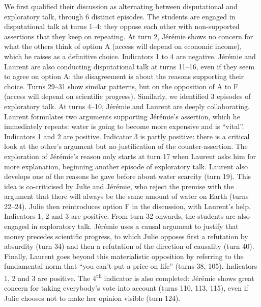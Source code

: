 \documentclass[output=paper]{langscibook}
\begin{document}
We first qualified their discussion as alternating between disputational and exploratory talk, through 6 distinct episodes. The students are engaged in disputational talk at turns 1--4: they oppose each other with non-supported assertions that they keep on repeating. At turn 2, Jérémie shows no concern for what the others think of option A (access will depend on economic income), which he raises as a definitive choice. Indicators 1 to 4 are negative. Jérémie and Laurent are also conducting disputational talk at turns 11--16, even if they seem to agree on option A: the disagreement is about the reasons supporting their choice. Turns 29--31 show similar patterns, but on the opposition of A to F (access will depend on scientific progress). Similarly, we identified 3 episodes of exploratory talk. At turns 4--10, Jérémie and Laurent are deeply collaborating. Laurent formulates two arguments supporting Jérémie’s assertion, which he immediately repeats: water is going to become more expensive and is “vital”. Indicators 1 and 2 are positive. Indicator 3 is partly positive: there is a critical look at the other’s argument but no justification of the counter-assertion. The exploration of Jérémie’s reason only starts at turn 17 when Laurent asks him for more explanation, beginning another episode of exploratory talk. Laurent also develops one of the reasons he gave before about water scarcity (turn 19). This idea is co-criticised by Julie and Jérémie, who reject the premise with the argument that there will always be the same amount of water on Earth (turns 22--24). Julie then reintroduces option F in the discussion, with Laurent’s help. Indicators 1, 2 and 3 are positive. From turn 32 onwards, the students are also engaged in exploratory talk. Jérémie uses a causal argument to justify that money precedes scientific progress, to which Julie opposes first a refutation by absurdity (turn 34) and then a refutation of the direction of causality (turn 40). Finally, Laurent goes beyond this materialistic opposition by referring to the fundamental norm that “you can’t put a price on life” (turns 38, 105). Indicators 1, 2 and 3 are positive. The 4\textsuperscript{th} indicator is also completed: Jérémie shows great concern for taking everybody’s vote into account (turns 110, 113, 115), even if Julie chooses not to make her opinion visible (turn 124).
\end{document}
